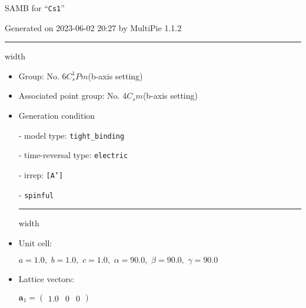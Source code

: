 \documentclass[fleqn,10pt,landscape]{article}
\begin{document}
\setcounter{MaxMatrixCols}{16}

\setlength{\baselineskip}{16pt}
\footnotesize
\begin{center}
\LARGE
SAMB for ``\texttt{Cs1}''
\end{center}
\begin{flushright}
Generated on 2023-06-02 20:27 by MultiPie 1.1.2
\end{flushright}
\vspace{1cm}


 \hfil \hrule height 1mm width \textwidth \hfil

\begin{itemize}
\item Group: No. 6\quad$C_{s}^{1}$\quad$Pm$\quad(b-axis setting)\quad[ monoclinic ]

\item Associated point group: No. 4\quad$C_{s}$\quad$m$\quad(b-axis setting)\quad[ monoclinic ]

\vspace{5mm}

\item Generation condition

\quad - model type: \texttt{tight_binding}

\quad - time-reversal type: \texttt{electric}

\quad - irrep: \texttt{[A']}

\quad - \texttt{spinful}


 \hfil \hrule height 1mm width \textwidth \hfil

\item Unit cell:

\quad $a=1.0,\,\, b=1.0,\,\, c=1.0,\,\, \alpha=90.0,\,\, \beta=90.0,\,\, \gamma=90.0$

\item Lattice vectors:

\quad $\bm{a}_1=\begin{pmatrix} 1.0 & 0 & 0 \end{pmatrix}$


\end{itemize}
\end{document}
